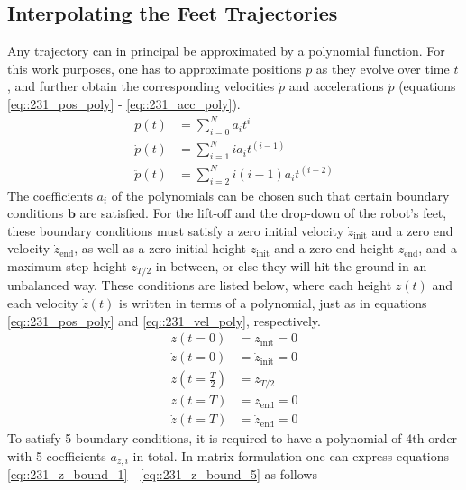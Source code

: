 \subsection{Interpolating the Feet Trajectories}
Any trajectory can in principal be approximated by a polynomial function. For this work purposes, one has to approximate positions $p$ as they evolve over time $t$, and further obtain the corresponding velocities $\dot{p}$ and accelerations $\ddot{p}$ (equations \ref{eq::231_pos_poly} - \ref{eq::231_acc_poly}).  
\begin{align}
	p(t) &= \sum_{i = 0}^{N}a_it^i 
	\label{eq::231_pos_poly}\\
	\dot{p}(t) &= \sum_{i = 1}^{N}ia_it^{(i-1)} 
	\label{eq::231_vel_poly}\\
	\ddot{p}(t) &= \sum_{i = 2}^{N}i(i-1)a_it^{(i-2)}
	\label{eq::231_acc_poly}
\end{align}
The coefficients $a_i$ of the polynomials can be chosen such that certain boundary conditions $\bm{b}$ are satisfied. For the lift-off and the drop-down of the robot's feet, these boundary conditions must satisfy a zero initial velocity $\dot{z}_\text{init}$ and a zero end velocity $\dot{z}_\text{end}$, as well as a zero initial height $z_\text{init}$ and a zero end height $z_\text{end}$, and a maximum step height $z_{T/2}$ in between, or else they will hit the ground in an unbalanced way. These conditions are listed below, where each height $z(t)$ and each velocity $\dot{z}(t)$ is written in terms of a polynomial, just as in equations \ref{eq::231_pos_poly} and \ref{eq::231_vel_poly}, respectively. 
\begin{align}
	z(t = 0) &= z_\text{init} = 0
	\label{eq::231_z_bound_1} \\
	\dot{z}(t = 0) &= \dot{z}_\text{init} = 0 \\
	z(t = \frac{T}{2}) &= z_{T/2}
	\label{eq::231_step}\\  
	z(t = T) &= z_\text{end} = 0 \\
	\dot{z}(t = T) &= \dot{z}_\text{end} = 0 
	\label{eq::231_z_bound_5}
\end{align}
To satisfy 5 boundary conditions, it is required to have a polynomial of 4th order with 5 coefficients $a_{z,i}$ in total. In matrix formulation one can express equations \ref{eq::231_z_bound_1} - \ref{eq::231_z_bound_5} as follows
